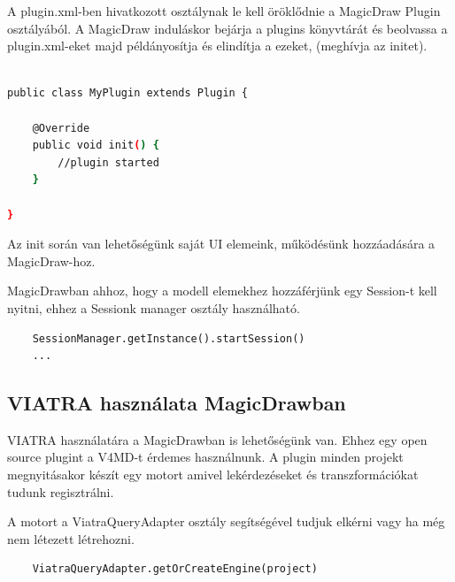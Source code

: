 A plugin.xml-ben hivatkozott osztálynak le kell öröklődnie a MagicDraw Plugin osztályából. A MagicDraw induláskor bejárja a plugins könyvtárát és beolvassa a plugin.xml-eket majd példányosítja és elindítja a ezeket, (meghívja az initet).

\begin{lstlisting}[language=bash,frame=single, float=t]

public class MyPlugin extends Plugin {

	@Override
	public void init() {
		//plugin started
	}

}
\end{lstlisting}

Az init során van lehetőségünk saját UI elemeink, működésünk hozzáadására a MagicDraw-hoz.

MagicDrawban ahhoz, hogy a modell elemekhez hozzáférjünk egy Session-t kell nyitni, ehhez a Sessionk manager osztály használható.

\begin{lstlisting}
	SessionManager.getInstance().startSession()
	...
\end{lstlisting}


\subsection{VIATRA használata MagicDrawban}

VIATRA használatára a MagicDrawban is lehetőségünk van. Ehhez egy open source plugint a V4MD-t érdemes használnunk. A plugin minden projekt megnyitásakor készít egy motort amivel lekérdezéseket és transzformációkat tudunk regisztrálni.

A motort a ViatraQueryAdapter osztály segítségével tudjuk elkérni vagy ha még nem létezett létrehozni.

\begin{lstlisting}
	ViatraQueryAdapter.getOrCreateEngine(project)
\end{lstlisting}


